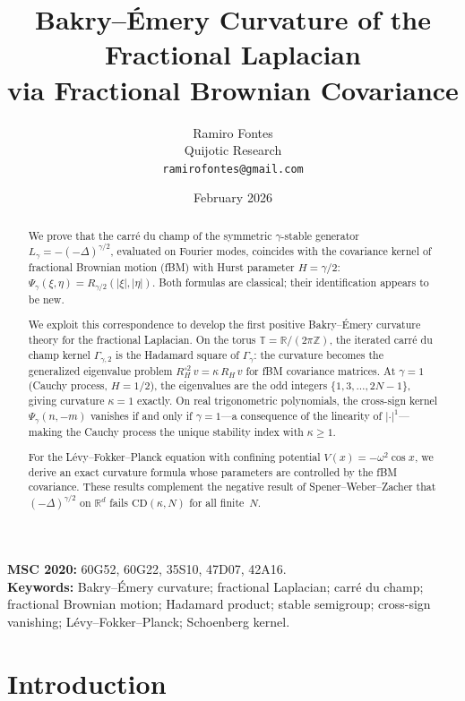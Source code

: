 \documentclass[11pt,a4paper]{article}
\title{Bakry--\'Emery Curvature of the Fractional Laplacian\\
via Fractional Brownian Covariance}
\author{Ramiro Fontes\\
Quijotic Research\\
\texttt{ramirofontes@gmail.com}}
\date{February 2026}
\theoremstyle{plain}
\theoremstyle{definition}
\theoremstyle{remark}
\newcommand{\R}{\mathbb{R}}
\newcommand{\Z}{\mathbb{Z}}
\newcommand{\T}{\mathbb{T}}
\begin{document}
\maketitle

\begin{abstract}
We prove that the carr\'e du champ of the symmetric $\gamma$-stable
generator $L_\gamma = -(-\Delta)^{\gamma/2}$, evaluated on Fourier modes,
coincides with the covariance kernel of fractional Brownian motion (fBM)
with Hurst parameter $H = \gamma/2$:
$\Psi_\gamma(\xi,\eta) = R_{\gamma/2}(|\xi|,|\eta|)$.
Both formulas are classical; their identification appears to be new.

We exploit this correspondence to develop the first positive Bakry--\'Emery
curvature theory for the fractional Laplacian.
On the torus $\T = \R/(2\pi\Z)$, the iterated carr\'e du champ
kernel $\Gamma_{\gamma,2}$ is the Hadamard square of $\Gamma_\gamma$:
the curvature becomes the generalized eigenvalue problem
$R_H^{\circ 2}\,v = \kappa\,R_H\,v$ for fBM covariance matrices.
At $\gamma = 1$ (Cauchy process, $H = 1/2$), the eigenvalues are the
odd integers $\{1,3,\ldots,2N{-}1\}$, giving curvature $\kappa = 1$
exactly.
On real trigonometric polynomials, the cross-sign kernel
$\Psi_\gamma(n,-m)$ vanishes if and only if $\gamma = 1$---a
consequence of the linearity of $|\cdot|^1$---making the Cauchy
process the unique stability index with $\kappa \geq 1$.

For the L\'evy--Fokker--Planck equation with confining potential
$V(x) = -\omega^2\cos x$, we derive an exact curvature formula
whose parameters are controlled by the fBM covariance.
These results complement the negative result of Spener--Weber--Zacher
that $(-\Delta)^{\gamma/2}$ on $\R^d$ fails
$\mathrm{CD}(\kappa,N)$ for all finite~$N$.
\end{abstract}

\medskip
\noindent\textbf{MSC 2020:} 60G52, 60G22, 35S10, 47D07, 42A16.\\
\textbf{Keywords:} Bakry--\'Emery curvature; fractional Laplacian;
carr\'e du champ; fractional Brownian motion; Hadamard product;
stable semigroup; cross-sign vanishing; L\'evy--Fokker--Planck;
Schoenberg kernel.


\section{Introduction}\label{sec:intro}
\end{document}
